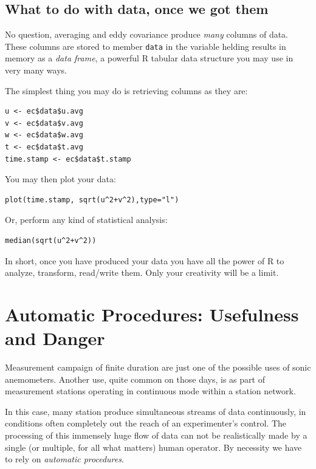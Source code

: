 \documentclass[a4paper,10pt]{book}
\begin{document}
\subsection{What to do with data, once we got them}

No question, averaging and eddy covariance produce \emph{many} columns of data. These columns are stored to member \verb|data| in the variable helding results in memory as a \emph{data frame}, a powerful R tabular data structure you may use in very many ways.

The simplest thing you may do is retrieving columns as they are:

\begin{verbatim}
u <- ec$data$u.avg
v <- ec$data$v.avg
w <- ec$data$w.avg
t <- ec$data$t.avg
time.stamp <- ec$data$t.stamp
\end{verbatim}

\noindent You may then plot your data:

\begin{verbatim}
plot(time.stamp, sqrt(u^2+v^2),type="l")
\end{verbatim}

\noindent Or, perform any kind of statistical analysis:

\begin{verbatim}
median(sqrt(u^2+v^2))
\end{verbatim}

In short, once you have produced your data you have all the power of R to analyze, transform, read/write them. Only your creativity will be a limit.

\section{Automatic Procedures: Usefulness and Danger}
\label{sec:Automatic procedures}

Measurement campaign of finite duration are just one of the possible uses of sonic anemometers. Another use, quite common on those days, is as part of measurement stations operating in continuous mode within a station network.

In this case, many station produce simultaneous streams of data continuously, in conditions often completely out the reach of an experimenter's control. The processing of this immensely huge flow of data can not be realistically made by a single (or multiple, for all what matters) human operator. By necessity we have to rely on \emph{automatic procedures}.
\end{document}
